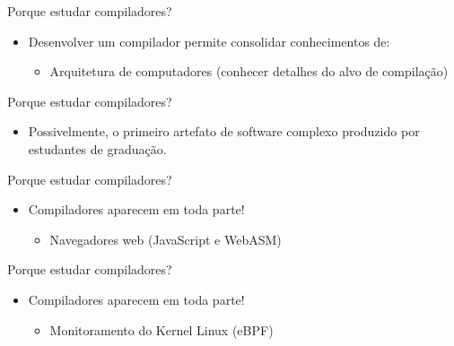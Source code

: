 \begin{frame}{Porque estudar compiladores?}

    \begin{itemize}

        \item
        Desenvolver um compilador permite consolidar conhecimentos de:

        \begin{itemize}

            \item
            Arquitetura de computadores (conhecer detalhes do alvo de
            compilação)
        \end{itemize}
    \end{itemize}
\end{frame}

\begin{frame}{Porque estudar compiladores?}

    \begin{itemize}

        \item
        Possivelmente, o primeiro artefato de software complexo produzido por
        estudantes de graduação.
    \end{itemize}
\end{frame}

\begin{frame}{Porque estudar compiladores?}

    \begin{itemize}

        \item
        Compiladores aparecem em toda parte!

        \begin{itemize}

            \item
            Navegadores web (JavaScript e WebASM)
        \end{itemize}
    \end{itemize}
\end{frame}

\begin{frame}{Porque estudar compiladores?}

    \begin{itemize}

        \item
        Compiladores aparecem em toda parte!

        \begin{itemize}

            \item
            Monitoramento do Kernel Linux (eBPF)
        \end{itemize}
    \end{itemize}
\end{frame}


